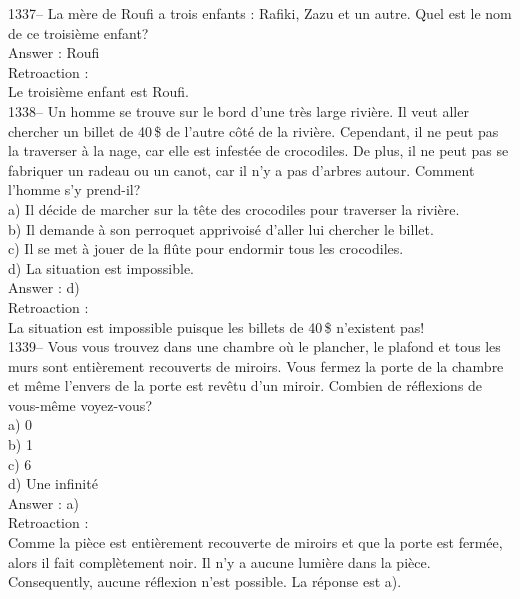 ﻿\documentclass[letterpaper, 12pt]{article}
\begin{document}
1337-- La m\`ere de Roufi a trois enfants : Rafiki, Zazu et un autre.  Quel
est le nom de ce troisi\`eme enfant?\\

Answer : Roufi\\

Retroaction : \\
Le troisi\`eme enfant est Roufi.\\

1338-- Un homme se trouve sur le bord d'une tr\`es large rivi\`ere.  Il veut
aller chercher un billet de 40\,\$ de l'autre c\^ot\'e de la rivi\`ere.
Cependant, il ne peut pas la traverser \`a la nage, car elle est infest\'ee
de crocodiles.  De plus, il ne peut pas se fabriquer un radeau ou un canot,
car il n'y a pas d'arbres autour.  Comment l'homme s'y prend-il?\\
a) Il d\'ecide de marcher sur la t\^ete des crocodiles  pour traverser la
rivi\`ere.\\
b) Il demande \`a son perroquet apprivois\'e d'aller lui chercher le
billet.\\
c) Il se met \`a jouer de la fl\^ute pour endormir tous les crocodiles. \\
d) La situation est impossible.\\

Answer : d)\\

Retroaction : \\
La situation est impossible puisque les billets de 40\,\$ n'existent pas! \\

1339-- Vous vous trouvez dans une chambre o\`u le plancher, le plafond et
tous les murs sont enti\`erement recouverts de miroirs.  Vous fermez la
porte de la chambre et m\^eme l'envers de la porte est rev\^etu d'un miroir.
  Combien de r\'eflexions de vous-m\^eme voyez-vous?\\
a) 0\\
b) 1\\
c) 6\\
d) Une infinit\'e\\

Answer : a)\\

Retroaction : \\
Comme la pi\`ece est enti\`erement recouverte de miroirs et que la porte est
ferm\'ee, alors il fait compl\`etement noir.  Il n'y a aucune lumi\`ere dans
la pi\`ece.  Consequently, aucune r\'eflexion n'est possible.  La
r\'eponse est a).\\
\end{document}
